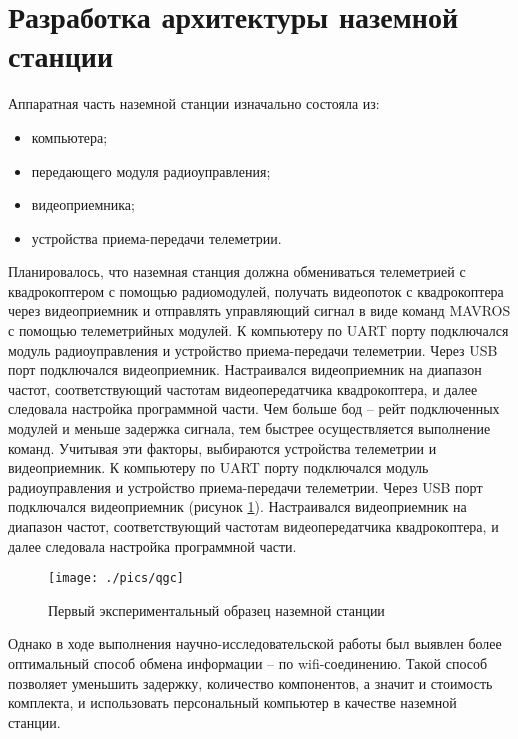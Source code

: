 \section{Разработка архитектуры наземной станции}

Аппаратная часть наземной станции изначально состояла из:
\begin{itemize}
	\item компьютера;
	\item передающего модуля радиоуправления;
	\item видеоприемника;
	\item устройства приема-передачи телеметрии.
\end{itemize}
Планировалось, что наземная станция должна обмениваться телеметрией с квадрокоптером с помощью радиомодулей, получать видеопоток с квадрокоптера через видеоприемник и отправлять управляющий сигнал в виде команд MAVROS с помощью телеметрийных модулей. 
К компьютеру по UART порту подключался модуль радиоуправления и устройство приема-передачи телеметрии. Через USB порт подключался видеоприемник. Настраивался видеоприемник на диапазон частот, соответствующий частотам видеопередатчика квадрокоптера, и далее следовала настройка программной части.
Чем больше бод -- рейт подключенных модулей и меньше задержка сигнала, тем быстрее осуществляется выполнение команд. Учитывая эти факторы, выбираются устройства телеметрии и видеоприемник.
К компьютеру по UART порту подключался модуль радиоуправления и устройство приема-передачи телеметрии. Через USB порт подключался видеоприемник (рисунок \ref{fig:ns}). Настраивался видеоприемник на диапазон частот, соответствующий частотам видеопередатчика квадрокоптера, и далее следовала настройка программной части.
\begin{figure}[H]
	\centering
	\texttt{[image: ./pics/qgc]}
	\caption{Первый экспериментальный образец наземной станции
	}
	\label{fig:ns} %
\end{figure}

Однако в ходе выполнения научно-исследовательской работы \cite{nir3} был выявлен более оптимальный способ обмена информации -- по wifi-соединению. Такой способ позволяет уменьшить задержку, количество компонентов, а значит и стоимость комплекта, и использовать персональный компьютер в качестве наземной станции. 

